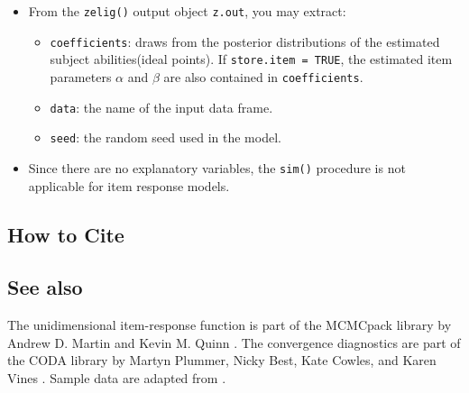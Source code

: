 \begin{itemize}

\item From the \texttt{zelig()} output object \texttt{z.out}, you may extract:

\begin{itemize}
\item \texttt{coefficients}: draws from the posterior distributions
of the estimated subject abilities(ideal points). If
\texttt{store.item = TRUE}, the estimated item parameters $\alpha$ and
$\beta$ are also contained in \texttt{coefficients}.

\item \texttt{data}: the name of the input data frame.
\item \texttt{seed}: the random seed used in the model.   

\end{itemize}

\item Since there are no explanatory variables, the \texttt{sim()}
procedure is not applicable for item response models.

\end{itemize}

\subsection*{How to Cite}



\subsection*{See also}
The unidimensional item-response function is part of the MCMCpack
library by Andrew D. Martin and Kevin M. Quinn \citep{MarQui05}.  The
convergence diagnostics are part of the CODA library by Martyn
Plummer, Nicky Best, Kate Cowles, and Karen Vines
\citep{PluBesCowVin05}. Sample data are adapted from \cite{MarQui05}.
